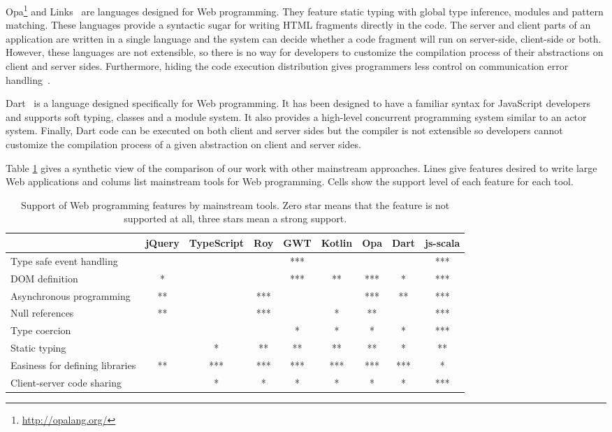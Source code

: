 \documentclass[american,english,runningheads]{llncs}
\begin{document}
Opa\footnote{\href{http://opalang.org/}{http://opalang.org/}} and Links~\cite{Cooper07_Links} are languages designed
for Web programming. They feature static typing with global type inference, modules and pattern matching. These
languages provide a syntactic sugar for writing HTML fragments directly in the code. The server and client parts of
an application are written in a single language and the system can decide whether a code fragment will run on
server-side, client-side or both. However, these languages are not extensible, so there is no way for developers to
customize the compilation process of their abstractions on client and server sides. Furthermore, hiding the code
execution distribution gives programmers less control on communication error handling~\cite{Guerraoui99_Distributed}.

Dart~\cite{Griffith11_Dart} is a language designed specifically for Web programming. It has been designed to have a
familiar syntax for JavaScript developers and supports soft typing, classes and a module system. It also provides a
high-level concurrent programming system similar to an actor system. Finally, Dart code can be executed on both
client and server sides but the compiler is not extensible so developers cannot customize the compilation process of
a given abstraction on client and server sides.

Table \ref{comparison} gives a synthetic view of the comparison of our work with other mainstream approaches. Lines
give features desired to write large Web applications and colums list mainstream tools for Web programming. Cells
show the support level of each feature for each tool.

\begin{table}
\centering
\begin{tabular}{| l | c | c | c | c | c | c | c | c |}
\hline
& jQuery & TypeScript & Roy & GWT & Kotlin & Opa & Dart & js-scala \\
\hline
Type safe event handling & & & & *** & & & & *** \\
\hline
DOM definition & * & & & *** & ** & *** & * & *** \\
\hline
Asynchronous programming & ** & & *** & & & *** & ** & *** \\
\hline
Null references & ** & & *** & & * & ** & & *** \\
\hline
Type coercion & & & & * & * & * & * & *** \\
\hline
Static typing & & * & ** & ** & ** & ** & * & ** \\
\hline
Easiness for defining libraries & ** & *** & *** & *** & *** & *** & *** & * \\
\hline
Client-server code sharing & & * & * & * & * & *  & * & *** \\
\hline
\end{tabular}
\caption{Support of Web programming features by mainstream tools. Zero star means that the feature is not supported
at all, three stars mean a strong support.}
\label{comparison}
\end{table}
\end{document}
